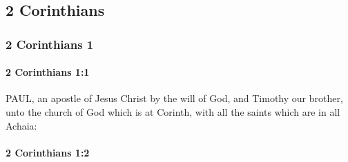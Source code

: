 \subsection{2 Corinthians}
	\label{2CORINTHIANS}
	
	\subsubsection{2 Corinthians 1} %
		\label{2CORINTHIANS-1}
		
		\paragraph{2 Corinthians 1:1} %
			\label{2CORINTHIANS-1-1}

			PAUL, an apostle of Jesus Christ by the will of God, and Timothy our brother, unto the church of God which is at Corinth, with all the saints which are in all Achaia:

			\begin{framed}
			\scriptsize
				\begin{compactdesc}
					\item[SBLG] 
				\end{compactdesc}
			\end{framed}

		\paragraph{2 Corinthians 1:2} %
			\label{2CORINTHIANS-1-2}

